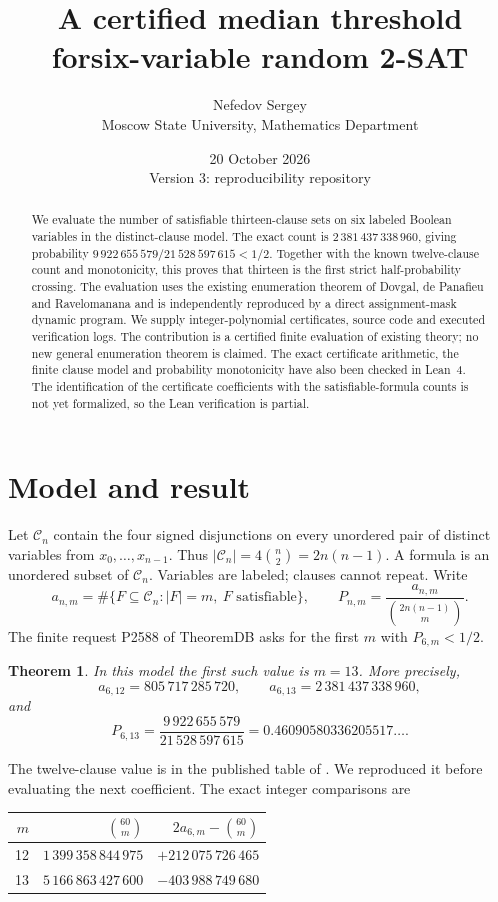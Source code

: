 \documentclass[11pt,a4paper]{article}
\title{A certified median threshold for\newline six-variable random 2-SAT}
\author{Nefedov Sergey\\\small Moscow State University, Mathematics Department}
\date{20 October 2026\\\small Version 3: reproducibility repository}
\newtheorem{theorem}{Theorem}
\begin{document}
\maketitle
\begin{abstract}
We evaluate the number of satisfiable thirteen-clause sets on six labeled Boolean
variables in the distinct-clause model. The exact count is
$2\,381\,437\,338\,960$, giving probability
$9\,922\,655\,579/21\,528\,597\,615<1/2$. Together with the known twelve-clause
count and monotonicity, this proves that thirteen is the first strict half-probability
crossing. The evaluation uses the existing enumeration theorem of Dovgal,
de Panafieu and Ravelomanana and is independently reproduced by a direct
assignment-mask dynamic program. We supply integer-polynomial certificates,
source code and executed verification logs. The contribution is a certified finite
evaluation of existing theory; no new general enumeration theorem is claimed.
The exact certificate arithmetic, the finite clause model and probability
monotonicity have also been checked in Lean~4. The identification of the
certificate coefficients with the satisfiable-formula counts is not yet
formalized, so the Lean verification is partial.
\end{abstract}

\section{Model and result}
Let $\mathcal C_n$ contain the four signed disjunctions on every unordered pair of
distinct variables from $x_0,\ldots,x_{n-1}$. Thus
$|\mathcal C_n|=4\binom n2=2n(n-1)$. A formula is an unordered subset of
$\mathcal C_n$. Variables are labeled; clauses cannot repeat. Write
\[
a_{n,m}=\#\{F\subseteq\mathcal C_n: |F|=m,\ F\text{ satisfiable}\},\qquad
P_{n,m}=\frac{a_{n,m}}{\binom{2n(n-1)}m}.
\]
The finite request P2588 of TheoremDB asks for the first $m$ with $P_{6,m}<1/2$.

\begin{theorem}
In this model the first such value is $m=13$. More precisely,
\[
a_{6,12}=805\,717\,285\,720,\qquad
a_{6,13}=2\,381\,437\,338\,960,
\]
and
\[
P_{6,13}=\frac{9\,922\,655\,579}{21\,528\,597\,615}
=0.46090580336205517\ldots.
\]
\end{theorem}

The twelve-clause value is in the published table of \cite{DPR}. We reproduced it
before evaluating the next coefficient. The exact integer comparisons are
\begin{center}
\begin{tabular}{r r r}
\toprule
$m$ & $\binom{60}m$ & $2a_{6,m}-\binom{60}m$\\
\midrule
12 & $1\,399\,358\,844\,975$ & $+212\,075\,726\,465$\\
13 & $5\,166\,863\,427\,600$ & $-403\,988\,749\,680$\\
\bottomrule
\end{tabular}
\end{center}
\end{document}
